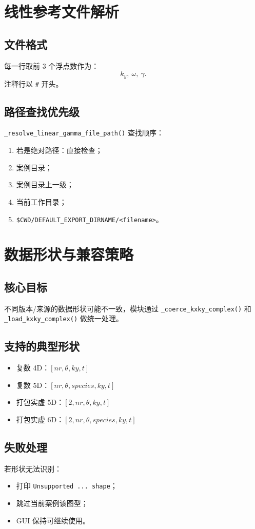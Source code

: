 \documentclass[11pt,a4paper]{ctexart}
\begin{document}
\section{线性参考文件解析}
\subsection{文件格式}
每一行取前 3 个浮点数作为：
\[
k_y,\ \omega,\ \gamma.
\]
注释行以 \texttt{\#} 开头。

\subsection{路径查找优先级}
\texttt{\_resolve\_linear\_gamma\_file\_path()} 查找顺序：
\begin{enumerate}
  \item 若是绝对路径：直接检查；
  \item 案例目录；
  \item 案例目录上一级；
  \item 当前工作目录；
  \item \texttt{\$CWD/DEFAULT\_EXPORT\_DIRNAME/<filename>}。
\end{enumerate}

\section{数据形状与兼容策略}
\subsection{核心目标}
不同版本/来源的数据形状可能不一致，模块通过 \texttt{\_coerce\_kxky\_complex()} 和
\texttt{\_load\_kxky\_complex()} 做统一处理。

\subsection{支持的典型形状}
\begin{itemize}
  \item 复数 4D：\([nr,\theta,ky,t]\)
  \item 复数 5D：\([nr,\theta,species,ky,t]\)
  \item 打包实虚 5D：\([2,nr,\theta,ky,t]\)
  \item 打包实虚 6D：\([2,nr,\theta,species,ky,t]\)
\end{itemize}

\subsection{失败处理}
若形状无法识别：
\begin{itemize}
  \item 打印 \texttt{Unsupported ... shape}；
  \item 跳过当前案例该图型；
  \item GUI 保持可继续使用。
\end{itemize}
\end{document}
